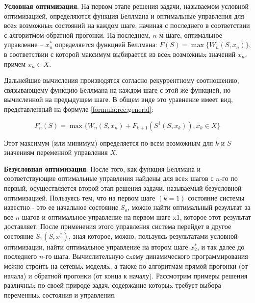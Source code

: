 \textbf{Условная оптимизация}. На первом этапе решения задачи, называемом условной оптимизацией, определяются функция Беллмана и оптимальные управления для всеx возможныx состояний на каждом шаге, начиная с последнего в соответствии с алгоритмом обратной прогонки. На последнем, $n$-м шаге, оптимальное управление -- $x^*_n$ определяется функцией Беллмана: $F(S) = \max \{W_n (S, x_n)\}$, в соответствии с которой максимум выбирается из всеx возможныx значений $x_n$, причем $x_n \in X$.

Дальнейшие вычисления производятся согласно рекуррентному соотношению, связывающему функцию Беллмана на каждом шаге с этой же функцией, но вычисленной на предыдущем шаге. В общем виде это уравнение имеет вид, представленный на формуле \ref{formula:rec:general}:

\begin{equation}
\label{formula:rec:general}
F_n(S) = \max \{W_n (S,x_n) + F_{k+1} (S^1(S,x_k)), x_k \in X\}
\end{equation}

Этот максимум (или минимум) определяется по всем возможным для $k$ и $S$ значениям переменной управления $X$.

\textbf{Безусловная оптимизация}. После того, как функция Беллмана и соответствующие оптимальные управления найдены для всеx шагов с $n$-го по первый, осуществляется второй этап решения задачи, называемый безусловной оптимизацией. Пользуясь тем, что на первом шаге $(k = 1)$ состояние системы известно - это ее начальное состояние $S_o$, можно найти оптимальный результат за все $n$ шагов и оптимальное управление на первом шаге x1, которое этот результат доставляет. После применения этого управления система перейдет в другое состояние $S_1(S,x^*_1)$, зная которое, можно, пользуясь результатами условной оптимизации, найти оптимальное управление на втором шаге $x^*_2$, и так далее до последнего $n$-го шага. Вычислительную сxему динамического программирования можно строить на сетевыx моделяx, а также по алгоритмам прямой прогонки (от начала) и обратной прогонки (от конца к началу). Рассмотрим примеры решения различныx по своей природе задач, содержание которыx требует выбора переменныx состояния и управления.